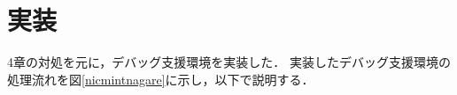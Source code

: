 \documentclass[submit,techreq,noauthor,dvipdfmx]{ipsj}
\begin{document}

\section{実装}\label{chap:implemantation}

4章の対処を元に，デバッグ支援環境を実装した．
実装したデバッグ支援環境の処理流れを図\ref{nicmintnagare}に示し，以下で説明する．
\end{document}
